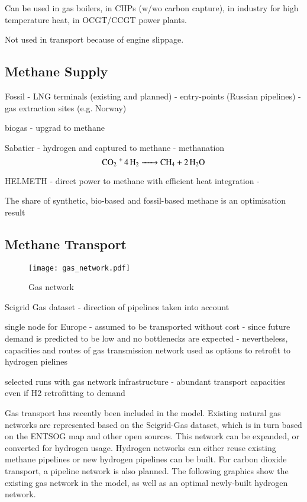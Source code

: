Can be used in gas boilers, in CHPs (w/wo carbon capture), in industry for high temperature heat, in OCGT/CCGT power plants.

Not used in transport because of engine slippage.

\subsection{Methane Supply}

Fossil
- LNG terminals (existing and planned)
- entry-points (Russian pipelines)
- gas extraction sites (e.g. Norway)

biogas
- upgrad to methane

Sabatier
- hydrogen and captured \co to methane
- methanation
\begin{equation}
    \ce{\co + 4H2 -> CH4 + 2H2O}
\end{equation}

HELMETH
- direct power to methane with efficient heat integration
- 

The share of synthetic, bio-based and fossil-based methane is an optimisation result

\subsection{Methane Transport}

\begin{figure}
    \texttt{[image: gas\_network.pdf]}
    \label{fig:gas-raw}
    \caption{Gas network}
\end{figure}

Scigrid Gas dataset
- direction of pipelines taken into account

single node for Europe
- assumed to be transported without cost
- since future demand is predicted to be low and no bottlenecks are expected
- nevertheless, capacities and routes of gas transmission network used as options to retrofit to hydrogen pielines

selected runs with gas network infrastructure
- abundant transport capacities even if H2 retrofitting to demand

Gas transport has recently been included in the model. Existing natural gas
networks are represented based on the Scigrid-Gas dataset, which is in turn
based on the ENTSOG map and other open sources. This network can be expanded, or
converted for hydrogen usage. Hydrogen networks can either reuse existing
methane pipelines or new hydrogen pipelines can be built. For carbon dioxide
transport, a pipeline network is also planned. The following graphics show the
existing gas network in the model, as well as an optimal newly-built hydrogen
network.

